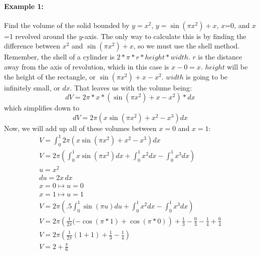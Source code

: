 \documentclass[../revisedmain.tex]{subfiles}
\begin{document}
\paragraph{Example 1:}Find the volume of the solid bounded by $y=x^2$, $y=\sin\left(\pi x^2\right)+x$, $x$=0, and $x$=1 revolved around the $y$-axis.\newline
The only way to calculate this is by finding the difference between $x^2$ and $\sin\left(\pi x^2\right)+x$, so we must use the shell method. Remember, the shell of a cylinder is $2*\pi*r*height*width$. $r$ is the distance away from the axis of revolution, which in this case is $x-0=x$. $height$ will be the height of the rectangle, or $\sin\left(\pi x^2\right)+x-x^2$. $width$ is going to be infinitely small, or $dx$. That leaves us with the volume being:\[dV=2\pi*x*\left(\sin\left(\pi x^2\right)+x-x^2\right)*dx\]which simplifies down to\[dV=2\pi \left(x\sin\left(\pi x^2\right)+x^2-x^3\right)dx\]Now, we will add up all of these volumes between $x=0$ and $x=1$:
\begin{gather*}
	V=\int_{0}^{1}2\pi \left(x\sin(\pi x^2)+x^2-x^3\right)dx\\
	V=2\pi\left(\int_{0}^{1}x\sin(\pi x^2)dx+\int_{0}^{1}x^2dx-\int_{0}^{1}x^3dx\right)\\
	u=x^2\\
	du=2x\,dx\\
	x=0\mapsto u=0\\
	x=1\mapsto u=1\\
	V=2\pi\left(.5\int_{0}^{1}\sin(\pi u)du+\int_{0}^{1}x^2dx-\int_{0}^{1}x^3dx\right)\\
	V=2\pi\left(\frac{1}{2\pi}(-\cos(\pi*1)+\cos(\pi*0)\right)+\frac{1}{3}-\frac{0}{3}-\frac{1}{4}+\frac{0}{4}\\
	V=2\pi\left(\frac{1}{2\pi}(1+1)+\frac{1}{3}-\frac{1}{4}\right)\\
	V=2+\frac{\pi}{6}\\
\end{gather*}
\newpage
\end{document}
